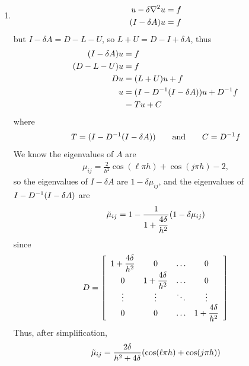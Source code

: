 \documentclass{article} %
\theoremstyle{plain}
\numberwithin{equation}{section} %
\numberwithin{figure}{section} %
\numberwithin{table}{section} %
\begin{document}
\begin{enumerate}[\ \ (a)]
    \item
        \begin{align*}
            u - \delta\laplacian u &= f \\
            (I - \delta A)u &= f
        \end{align*}
        but $I - \delta A = D - L - U$, so $L + U = D - I + \delta A$, thus
        \begin{align*}
            (I - \delta A)u &= f \\
            (D - L - U)u &= f \\
            Du &= (L + U)u + f \\
            u &= (I - D^{-1}\qty(I - \delta A))u + D^{-1}f \\
            &= Tu + C
        \end{align*}
        where
        \begin{align*}
            T = (I - D^{-1}\qty(I - \delta A)) \qquad \text{and} \qquad C = D^{-1}f
        \end{align*}
        We know the eigenvalues of $A$ are
        \begin{align*}
            \mu_{ij} = \frac{2}{h^2}\cos(\ell\pi h) + \cos(j\pi h) - 2,
        \end{align*}
        so the eigenvalues of $I - \delta A$ are $1 - \delta \mu_{ij}$, and the eigenvalues of $I - D^{-1}\qty(I - \delta A)$ are
        \begin{align*}
            \tilde{\mu}_{ij} = 1 - \frac{1}{1 + \dfrac{4\delta}{h^2}}\qty(1 - \delta \mu_{ij})
        \end{align*}
        since
        \begin{align*}
            D = \qty[\begin{array}{cccc}
                1 + \dfrac{4\delta}{h^2} & 0 & \dots & 0 \\
                0 & 1 + \dfrac{4\delta}{h^2} & \dots & 0 \\
                \vdots & \vdots & \ddots & \vdots \\
                0 & 0 & \dots & 1 + \dfrac{4\delta}{h^2}
            \end{array}]
        \end{align*}
        Thus, after simplification,
        \begin{align*}
            \tilde{\mu}_{ij} = \frac{2\delta}{h^2 + 4\delta}\qty(\cos(\ell\pi h) + \cos(j\pi h))
        \end{align*}


\end{enumerate}
\end{document}
